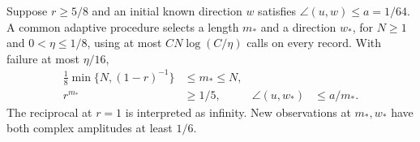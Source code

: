 \begin{lemma}
\label{lem:noiseblock76}
Suppose $r\ge5/8$ and an initial known direction $w$ satisfies
$\angle(u,w)\le a=1/64$.  A common adaptive procedure selects a
length $m_*$ and a direction $w_*$, for $N\ge1$ and
$0<\eta\le1/8$, using at most $CN\log(C/\eta)$ calls on every
record.  With failure at most
$\eta/16$,
\begin{align}
 \tfrac18\min\{N,(1-r)^{-1}\}&\le m_*\le N,
                                      \label{eq:learnblockscale76}\\
 r^{m_*}&\ge1/5,
 &\angle(u,w_*)&\le a/m_*.
                                      \label{eq:learnblockaxis76}
\end{align}
The reciprocal at $r=1$ is interpreted as infinity.  New observations
at $m_*,w_*$ have both complex amplitudes at least $1/6$.
\end{lemma}

